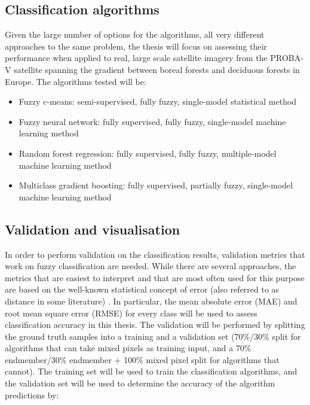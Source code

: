 \documentclass[a4paper,10pt]{article}
\begin{document}
\subsection{Classification algorithms}

Given the large number of options for the algorithms, all very different approaches to the same problem, the thesis will focus on assessing their performance when applied to real, large scale satellite imagery from the PROBA-V satellite spanning the gradient between boreal forests and deciduous forests in Europe. The algorithms tested will be:

\begin{itemize}
 \item Fuzzy c-means: semi-supervised, fully fuzzy, single-model statistical method
 \item Fuzzy neural network: fully supervised, fully fuzzy, single-model machine learning method
 \item Random forest regression: fully supervised, fully fuzzy, multiple-model machine learning method
 \item Multiclass gradient boosting: fully supervised, partially fuzzy, single-model machine learning method
\end{itemize}

\subsection{Validation and visualisation}

In order to perform validation on the classification results, validation metrics that work on fuzzy classification are needed. While there are several approaches, the metrics that are easiest to interpret and that are most often used for this purpose are based on the well-known statistical concept of error (also referred to as distance in some literature) \cite{foody1996fuzzyevaluation}. In particular, the mean absolute error (MAE) and root mean square error (RMSE) for every class will be used to assess classification accuracy in this thesis. The validation will be performed by splitting the ground truth samples into a training and a validation set (70\%/30\% split for algorithms that can take mixed pixels as training input, and a 70\% endmember/30\% endmember + 100\% mixed pixel split for algorithms that cannot). The training set will be used to train the classification algorithms, and the validation set will be used to determine the accuracy of the algorithm predictions by:
\end{document}
